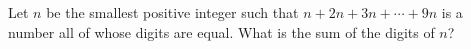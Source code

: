 Let $n$ be the smallest positive integer such that $n+2n+3n+\cdots+9n$ is a number all of whose digits are equal. What is the sum of the digits of $n$?

